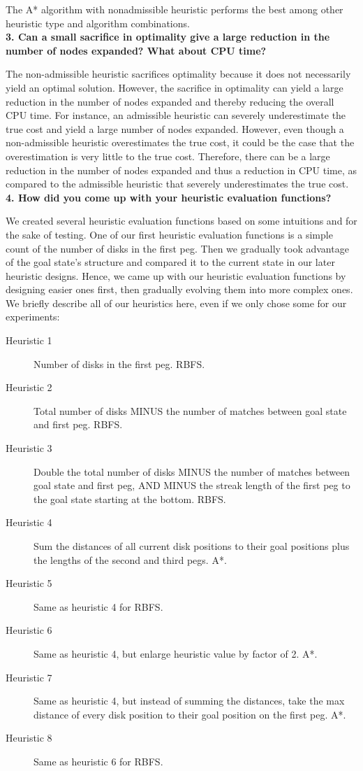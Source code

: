 The A* algorithm with nonadmissible heuristic performs the best among other heuristic type and algorithm combinations.\\

\textbf{3. Can a small sacrifice in optimality give a large reduction in the number of nodes expanded? What about CPU time?}

The non-admissible heuristic sacrifices optimality because it does not necessarily yield an optimal solution. However, the sacrifice in optimality can yield a large reduction in the number of nodes expanded and thereby reducing the overall CPU time. For instance, an admissible heuristic can severely underestimate the true cost and yield a large number of nodes expanded. However, even though a non-admissible heuristic overestimates the true cost, it could be the case that the overestimation is very little to the true cost. Therefore, there can be a large reduction in the number of nodes expanded and thus a reduction in CPU time, as compared to the admissible heuristic that severely underestimates the true cost.\\

\textbf{4. How did you come up with your heuristic evaluation functions?}

We created several heuristic evaluation functions based on some intuitions and for the sake of testing. One of our first heuristic evaluation functions is a simple count of the number of disks in the first peg. Then we gradually took advantage of the goal state's structure and compared it to the current state in our later heuristic designs. Hence, we came up with our heuristic evaluation functions by designing easier ones first, then gradually evolving them into more complex ones. We briefly describe all of our heuristics here, even if we only chose some for our experiments:

\begin{description}
	\item[Heuristic 1] Number of disks in the first peg. RBFS.
	\item[Heuristic 2] Total number of disks MINUS the number of matches between goal state and first peg. RBFS.
	\item[Heuristic 3] Double the total number of disks MINUS the number of matches between goal state and first peg, AND MINUS the streak length of the first peg to the goal state starting at the bottom. RBFS.
	\item[Heuristic 4] Sum the distances of all current disk positions to their goal positions plus the lengths of the second and third pegs. A*.
	\item[Heuristic 5] Same as heuristic 4 for RBFS.
	\item[Heuristic 6] Same as heuristic 4, but enlarge heuristic value by factor of 2. A*. 
	\item[Heuristic 7] Same as heuristic 4, but instead of summing the distances, take the max distance of every disk position to their goal position on the first peg. A*.
	\item[Heuristic 8] Same as heuristic 6 for RBFS.
\end{description}

